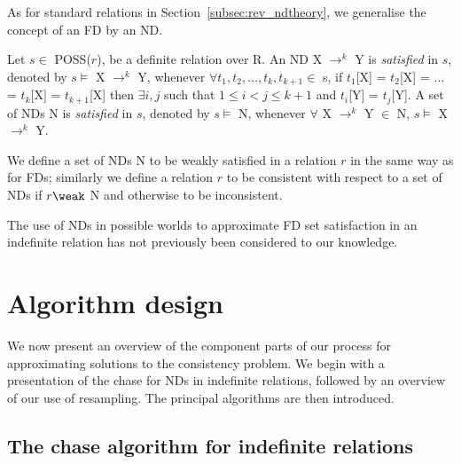 As for standard relations in Section~\ref{subsec:rev_ndtheory}, we
generalise the concept of an FD by an ND. 
 

\begin{definition}\label{def:sat-nd-indef}
\begin{rm}
Let $s \in$ POSS($r$), be a definite relation over R.
An ND X $\to^k$ Y is {\em satisfied} in $s$,
denoted by $s \models$ X $\to^k$ Y, whenever
$\forall t_1, t_2, \ldots, t_k, t_{k+1} \in$ s, if 
$t_1$[X] = $t_2$[X] = $\ldots$ = $t_k$[X] = $t_{k+1}$[X] then 
$\exists i,j$ such that $1 \le i < j \le k+1$
and $t_i$[Y] = $t_j$[Y].
A set of NDs N is {\em satisfied} in $s$,
denoted by $s \models$ N, whenever
$\forall$ X $\to^k$ Y $\in$ N, $s \models$ X $\to^k$ Y.

We define a set of NDs N to be weakly satisfied in a relation $r$
in the same way as for FDs; similarly we define 
a relation $r$ to be consistent with respect to a set of NDs if
$r \weak$ N and otherwise to be inconsistent.
\end{rm}
\end{definition}

\smallskip

The use of NDs in possible worlds to approximate FD set satisfaction
in an indefinite relation has not previously been considered to our
knowledge. 

\section{Algorithm design}\label{sec:algdes}

We now present an overview of the component parts of our process for
approximating solutions to the consistency problem. We begin with a
presentation of the chase for NDs in indefinite relations, followed by
an overview of our use of resampling.  The principal algorithms are
then introduced.

\subsection{The chase algorithm for indefinite
relations}\label{subsec:cp_ndchase}

